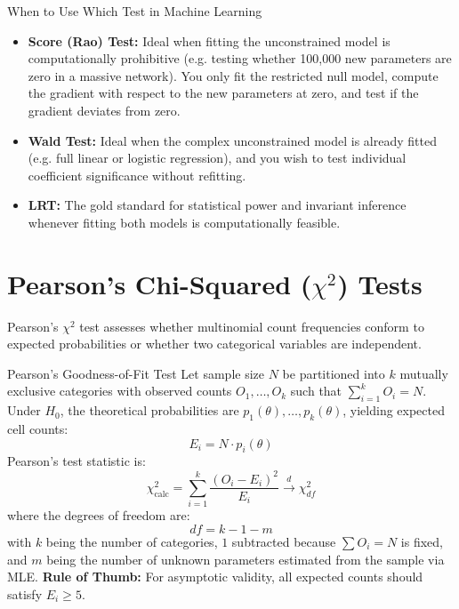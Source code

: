 \begin{intuitionbox}{When to Use Which Test in Machine Learning}
\begin{itemize}
    \item \textbf{Score (Rao) Test:} Ideal when fitting the unconstrained model is computationally prohibitive (e.g. testing whether 100,000 new parameters are zero in a massive network). You only fit the restricted null model, compute the gradient with respect to the new parameters at zero, and test if the gradient deviates from zero.
    \item \textbf{Wald Test:} Ideal when the complex unconstrained model is already fitted (e.g. full linear or logistic regression), and you wish to test individual coefficient significance without refitting.
    \item \textbf{LRT:} The gold standard for statistical power and invariant inference whenever fitting both models is computationally feasible.
\end{itemize}
\end{intuitionbox}

\section{Pearson's Chi-Squared ($\chi^2$) Tests}

Pearson's $\chi^2$ test assesses whether multinomial count frequencies conform to expected probabilities or whether two categorical variables are independent.

\begin{formulabox}{Pearson's Goodness-of-Fit Test}
Let sample size $N$ be partitioned into $k$ mutually exclusive categories with observed counts $O_1, \dots, O_k$ such that $\sum_{i=1}^k O_i = N$. Under $H_0$, the theoretical probabilities are $p_1(\theta), \dots, p_k(\theta)$, yielding expected cell counts:
$$E_i = N \cdot p_i(\theta)$$
Pearson's test statistic is:
$$\chi_{\text{calc}}^2 = \sum_{i=1}^k \frac{(O_i - E_i)^2}{E_i} \xrightarrow{d} \chi_{df}^2$$
where the degrees of freedom are:
$$df = k - 1 - m$$
with $k$ being the number of categories, $1$ subtracted because $\sum O_i = N$ is fixed, and $m$ being the number of unknown parameters estimated from the sample via MLE.
\textbf{Rule of Thumb:} For asymptotic validity, all expected counts should satisfy $E_i \ge 5$.
\end{formulabox}

